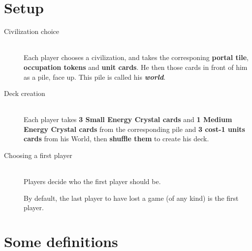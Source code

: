\documentclass[a4paper]{article}
\begin{document}
\newpage
\section{Setup}

    \begin{description}
        \item[Civilization choice] \hfill \\
            Each player chooses a civilization, and takes the corresponing
            \textbf{portal tile}, \textbf{occupation tokens} and \textbf{unit cards}.
            He then those cards in front of him as a pile, face up.
            This pile is called his \textit{\textbf{world}}.
        \item[Deck creation] \hfill \\
            Each player takes \textbf{3 Small Energy Crystal cards}
            and \textbf{1 Medium Energy Crystal cards}
            from the corresponding pile and \textbf{3 cost-1 units cards} from his World,
            then \textbf{shuffle them} to create his deck.
        \item[Choosing a first player] \hfill \\
            Players decide who the first player should be.
            
            By default, the last player to have lost a game
            (of any kind) is the first player.
    \end{description}

\newpage
\section{Some definitions}
\end{document}
